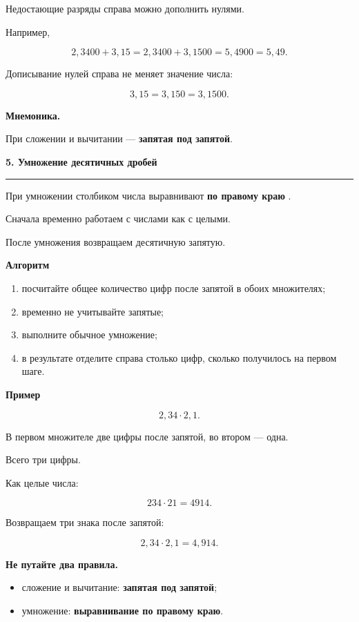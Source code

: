 \documentclass[a4paper,12pt]{article}
\newcommand{\topic}[1]{%
    \par\vspace{0.9em}%
    {\Large\bfseries\color{darkaccent}#1}\par
    \vspace{0.25em}
    \noindent
    \color{accent}\rule{\linewidth}{0.6pt}
    \color{black}
    \vspace{0.55em}
}
\newcommand{\subtopic}[1]{%
    \par\vspace{0.55em}%
    {\large\bfseries\color{textgray}#1}\par
    \vspace{0.2em}
}
\newcommand{\important}[1]{%
    \textbf{\color{darkaccent}#1}%
}
\begin{document}
Недостающие разряды справа можно дополнить нулями.

Например,

\[
2{,}3400+3{,}15
=
2{,}3400+3{,}1500
=
5{,}4900
=
5{,}49.
\]

Дописывание нулей справа не меняет значение числа:

\[
3{,}15=3{,}150=3{,}1500.
\]

\important{Мнемоника.}
При сложении и вычитании --- \textbf{запятая под запятой}.


\topic{5. Умножение десятичных дробей}

При умножении столбиком числа выравнивают
\important{по правому краю}.

Сначала временно работаем с числами как с целыми.

После умножения возвращаем десятичную запятую.

\subtopic{Алгоритм}

\begin{enumerate}[label=\arabic*)]
    \item посчитайте общее количество цифр после запятой
    в обоих множителях;
    \item временно не учитывайте запятые;
    \item выполните обычное умножение;
    \item в результате отделите справа столько цифр,
    сколько получилось на первом шаге.
\end{enumerate}

\subtopic{Пример}

\[
2{,}34\cdot2{,}1.
\]

В первом множителе две цифры после запятой,
во втором --- одна.

Всего три цифры.

Как целые числа:

\[
234\cdot21=4914.
\]

Возвращаем три знака после запятой:

\[
2{,}34\cdot2{,}1=4{,}914.
\]

\important{Не путайте два правила.}

\begin{itemize}
    \item сложение и вычитание:
    \textbf{запятая под запятой};
    \item умножение:
    \textbf{выравнивание по правому краю}.
\end{itemize}
\end{document}
